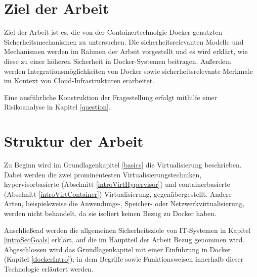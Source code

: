 \documentclass[../main.tex]{subfiles}
\begin{document}


  \section{Ziel der Arbeit}
    Ziel der Arbeit ist es, die von der Containertechnolgie Docker genutzten Sicherheitsmechanismen zu untersuchen. Die sicherheitsrelevanten Modelle und Mechanismen werden im Rahmen der Arbeit vorgestellt und es wird erklärt, wie diese zu einer höheren Sicherheit in Docker-Systemen beitragen.
    Außerdem werden Integrationsmöglichkeiten von Docker sowie sicherheitsrelevante Merkmale im Kontext von Cloud-Infrastrukturen erarbeitet.

    Eine ausführliche Konstruktion der Fragestellung erfolgt mithilfe einer Risikoanalyse in Kapitel \ref{question}.

  \section{Struktur der Arbeit}
    Zu Beginn wird im Grundlagenkapitel \ref{basics} die Virtualisierung beschrieben. Dabei werden die zwei prominentesten Virtualisierungstechniken, hypervisorbasierte (Abschnitt \ref{introVirtHypervisor}) und containerbasierte (Abschnitt \ref{introVirtContainer}) Virtualisierung, gegenübergestellt.
    Andere Arten, beispielsweise die Anwendungs-, Speicher- oder Netzwerkvirtualisierung, werden nicht behandelt, da sie isoliert keinen Bezug zu Docker haben.

    Anschließend werden die allgemeinen Sicherheitsziele von \acrshort{IT}-Systemen in Kapitel \ref{introSecGoals} erklärt, auf die im Hauptteil der Arbeit Bezug genommen wird. Abgeschlossen wird das Grundlagenkapitel mit einer Einführung in Docker (Kapitel \ref{dockerIntro}), in dem Begriffe sowie Funktionsweisen innerhalb dieser Technologie erläutert werden.
\end{document}
